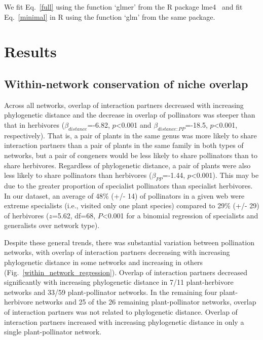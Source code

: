 \documentclass[12pt]{article}
\begin{document}
\begin{spacing}{1.5}
  \noindent We fit Eq.~\ref{full} using the function `glmer' from the
  R package lme4~\citep{lme4} and fit Eq.~\ref{minimal} in R using the
  function `glm' from the same package.


\section*{Results}


  \subsection*{Within-network conservation of niche overlap}

    Across all networks, overlap of interaction partners decreased with increasing phylogenetic distance and the decrease in overlap of pollinators was steeper than that in herbivores ($\beta_{distance}$=-6.82, $p$\textless0.001 and $\beta_{distance:PP}$=-18.5, $p$\textless0.001, respectively). That is, a pair of plants in the same genus was more likely to share interaction partners than a pair of plants in the same family in both types of networks, but a pair of congeners would be less likely to share pollinators than to share herbivores. Regardless of phylogenetic distance, a pair of plants were also less likely to share pollinators than herbivores ($\beta_{PP}$=-1.44, $p$\textless0.001). This may be due to the greater proportion of
    specialist pollinators than specialist herbivores. In our dataset, an
    average of 48\% (+/- 14) of pollinators in a given web were extreme 
    specialists (i.e., visited only one plant species) compared to 29\% 
    (+/- 29) of herbivores ($z$=5.62, df=68, $P$\textless0.001 
    for a binomial regression of specialists and generalists over network
    type). %
 

    Despite these general trends, there was substantial variation between 
    pollination networks, with overlap of interaction partners decreasing 
    with increasing phylogenetic distance in some networks and increasing in 
    others (Fig.~\ref{within_network_regression}). Overlap of interaction partners decreased significantly with increasing phylogenetic distance in 7/11 plant-herbivore networks and 33/59 plant-pollinator networks. In the remaining four plant-herbivore networks and 25 of the 26 remaining plant-pollinator networks, overlap of interaction partners was not related to phylogenetic distance. Overlap of interaction partners increased with increasing phylogenetic distance in only a single plant-pollinator network.%



\end{spacing}
\end{document}
